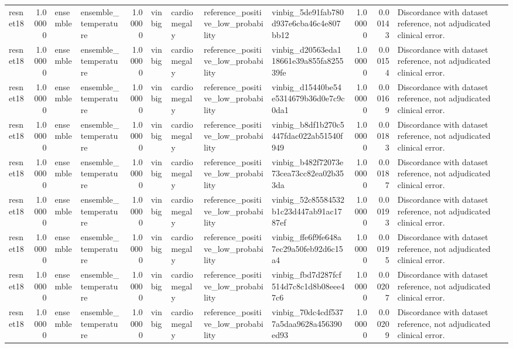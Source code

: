 \begin{tabular}{lrllrllllrrl}
resnet18 & 1.00000 & ensemble & ensemble\_temperature & 1.00000 & vinbig & cardiomegaly & reference\_positive\_low\_probability & vinbig\_5de91fab780d937e6cba46c4e807bb12 & 1.00000 & 0.00143 & Discordance with dataset reference, not adjudicated clinical error. \\
resnet18 & 1.00000 & ensemble & ensemble\_temperature & 1.00000 & vinbig & cardiomegaly & reference\_positive\_low\_probability & vinbig\_d20563eda118661e39a855fa825539fe & 1.00000 & 0.00154 & Discordance with dataset reference, not adjudicated clinical error. \\
resnet18 & 1.00000 & ensemble & ensemble\_temperature & 1.00000 & vinbig & cardiomegaly & reference\_positive\_low\_probability & vinbig\_d15440be54e5314679b36d0e7c9c0da1 & 1.00000 & 0.00169 & Discordance with dataset reference, not adjudicated clinical error. \\
resnet18 & 1.00000 & ensemble & ensemble\_temperature & 1.00000 & vinbig & cardiomegaly & reference\_positive\_low\_probability & vinbig\_b8df1b270c5447fdac022ab51540f949 & 1.00000 & 0.00183 & Discordance with dataset reference, not adjudicated clinical error. \\
resnet18 & 1.00000 & ensemble & ensemble\_temperature & 1.00000 & vinbig & cardiomegaly & reference\_positive\_low\_probability & vinbig\_b482f72073e73cea73cc82ea02b353da & 1.00000 & 0.00187 & Discordance with dataset reference, not adjudicated clinical error. \\
resnet18 & 1.00000 & ensemble & ensemble\_temperature & 1.00000 & vinbig & cardiomegaly & reference\_positive\_low\_probability & vinbig\_52c85584532b1c23d447ab91ac1787ef & 1.00000 & 0.00193 & Discordance with dataset reference, not adjudicated clinical error. \\
resnet18 & 1.00000 & ensemble & ensemble\_temperature & 1.00000 & vinbig & cardiomegaly & reference\_positive\_low\_probability & vinbig\_ffe6f9fe648a7ec29a50feb92d6c15a4 & 1.00000 & 0.00195 & Discordance with dataset reference, not adjudicated clinical error. \\
resnet18 & 1.00000 & ensemble & ensemble\_temperature & 1.00000 & vinbig & cardiomegaly & reference\_positive\_low\_probability & vinbig\_fbd7d287fcf514d7c8c1d8b08eee47c6 & 1.00000 & 0.00207 & Discordance with dataset reference, not adjudicated clinical error. \\
resnet18 & 1.00000 & ensemble & ensemble\_temperature & 1.00000 & vinbig & cardiomegaly & reference\_positive\_low\_probability & vinbig\_70dc4cdf5377a5daa9628a456390ed93 & 1.00000 & 0.00209 & Discordance with dataset reference, not adjudicated clinical error. \\

\end{tabular}
